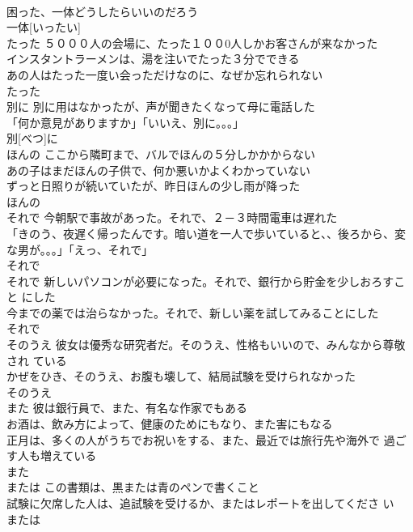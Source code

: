 \documentclass[8pt]{extreport}
\begin{document}
\begin{CJK}{UTF8}{min}
\\	困った、一体どうしたらいいのだろう 
\\	一体[いったい]			
\\	たった	５０００人の会場に、たった１００0人しかお客さんが来なかった 
\\	インスタントラーメンは、湯を注いでたった３分でできる 
\\	あの人はたった一度い会っただけなのに、なぜか忘れられない 
\\	たった			
\\	別に	別に用はなかったが、声が聞きたくなって母に電話した 
\\	「何か意見がありますか」「いいえ、別に。。。」 
\\	別[べつ]に			
\\	ほんの	ここから隣町まで、バルでほんの５分しかかからない 
\\	あの子はまだほんの子供で、何か悪いかよくわかっていない 
\\	ずっと日照りが続いていたが、昨日ほんの少し雨が降った 
\\	ほんの			
\\	それで	今朝駅で事故があった。それで、２－３時間電車は遅れた 
\\	「きのう、夜遅く帰ったんです。暗い道を一人で歩いていると、、後ろから、変な男が。。。」「えっ、それで」 
\\	それで			
\\	それで	新しいパソコンが必要になった。それで、銀行から貯金を少しおろすこと にした 
\\	今までの薬では治らなかった。それで、新しい薬を試してみることにした 
\\	それで			
\\	そのうえ	彼女は優秀な研究者だ。そのうえ、性格もいいので、みんなから尊敬され ている 
\\	かぜをひき、そのうえ、お腹も壊して、結局試験を受けられなかった 
\\	そのうえ			
\\	また	彼は銀行員で、また、有名な作家でもある 
\\	お酒は、飲み方によって、健康のためにもなり、また害にもなる 
\\	正月は、多くの人がうちでお祝いをする、また、最近では旅行先や海外で 過ごす人も増えている 
\\	また			
\\	または	この書類は、黒または青のペンで書くこと 
\\	試験に欠席した人は、追試験を受けるか、またはレポートを出してくださ い 
\\	または			

\end{CJK}
\end{document}
